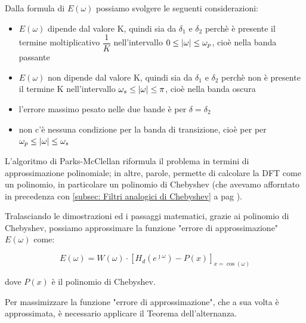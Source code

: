 Dalla formula di $E \left(\omega\right)$ possiamo svolgere le seguenti considerazioni: 

\begin{itemize}
    \item $E \left(\omega\right)$ dipende dal valore K, quindi sia da $\delta_1$ e $\delta_2$ perchè è presente il termine moltiplicativo $\dfrac{1}{K}$ nell'intervallo $0 \leq \abs{\omega} \leq \omega_p$, cioè nella banda passante   
    \item $E \left(\omega\right)$ non dipende dal valore K, quindi sia da $\delta_1$ e $\delta_2$ perchè non è presente il termine K nell'intervallo $\omega_s \leq \abs{\omega} \leq \pi$, cioè nella banda oscura 
    \item l'errore massimo pesato nelle due bande è per $\delta = \delta_2 $
    \item non c'è nessuna condizione per la banda di transizione, cioè per per $\omega_p \leq \abs{\omega}  \leq \omega_s$ 
\end{itemize} 

\newpage 

L'algoritmo di Parks-McClellan riformula il problema in termini di approssimazione polinomiale; 
in altre, parole, permette di calcolare la DFT come un polinomio, in particolare un polinomio di Chebyshev 
(che avevamo afforntato in precedenza con \ref{subsec: Filtri analogici di Chebyshev}  a pag \pageref{subsec: Filtri analogici di Chebyshev}). \newline 

Tralasciando le dimostrazioni ed i passaggi matematici, 
grazie ai polinomio di Chebyshev, possiamo approssimare la funzione "errore di approssimazione" $E \left(\omega\right)$ come: 

{
    \Large 
    \begin{equation}
        E \left(\omega\right) 
        = 
        W \left(\omega\right) 
        \cdot 
        \left[ 
            H_d \left(e^{\jmath \omega}\right) 
            - 
            P \left(x\right)
        \right]_{x = \cos(\omega)}
    \end{equation}
}

dove $P \left(x\right)$ è il polinomio di Chebyshev. \newline 

Per massimizzare la funzione "errore di approssimazione", che a sua volta è approssimata, è necessario applicare il Teorema dell'alternanza. 

\newpage 


